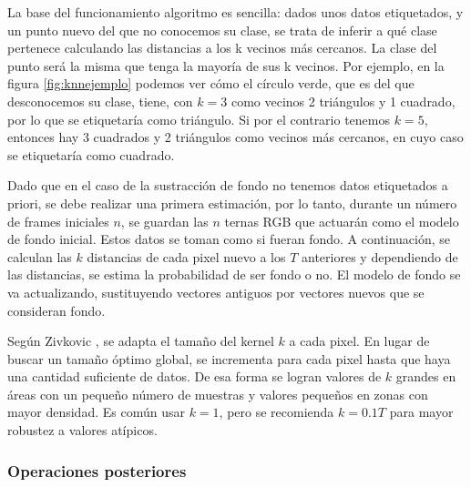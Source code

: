 La base del funcionamiento algoritmo es sencilla: dados unos datos etiquetados, y un punto nuevo del que no conocemos su clase, se trata de inferir a qué clase pertenece calculando las distancias a los k vecinos más cercanos. La clase del punto será la misma que tenga la mayoría de sus k vecinos. Por ejemplo, en la figura \ref{fig:knnejemplo} podemos ver cómo el círculo verde, que es del que desconocemos su clase, tiene, con $k=3$ como vecinos 2 triángulos y 1 cuadrado, por lo que se etiquetaría como triángulo. Si por el contrario tenemos $k=5$, entonces hay 3 cuadrados y 2 triángulos como vecinos más cercanos, en cuyo caso se etiquetaría como cuadrado.

Dado que en el caso de la sustracción de fondo no tenemos datos etiquetados a priori, se debe realizar una primera estimación, por lo tanto, durante un número de frames iniciales $n$, se guardan las $n$ ternas RGB que actuarán como el modelo de fondo inicial. Estos datos se toman como si fueran fondo. A continuación, se calculan las $k$ distancias de cada pixel nuevo a los $T$ anteriores y dependiendo de las distancias, se estima la probabilidad de ser fondo o no. El modelo de fondo se va actualizando, sustituyendo vectores antiguos por vectores nuevos que se consideran fondo.

Según Zivkovic \cite{art:Zivkovic2}, se adapta el tamaño del kernel $k$ a cada pixel. En lugar de buscar un tamaño óptimo global, se incrementa para cada pixel hasta que haya una cantidad suficiente de datos. De esa forma se logran valores de $k$ grandes en áreas con un pequeño número de muestras y valores pequeños en zonas con mayor densidad. Es común usar $k=1$, pero se recomienda $k=0.1T$ para mayor robustez a valores atípicos.

\subsubsection*{Operaciones posteriores}


